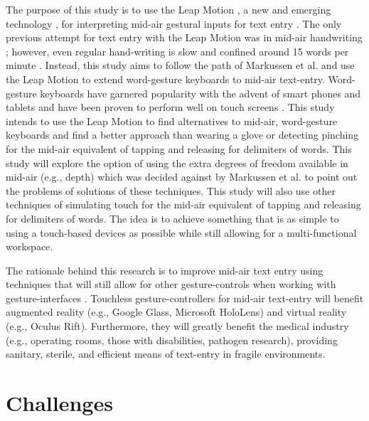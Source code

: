The purpose of this study is to use the Leap Motion \cite{ref_leap_motion}, a new and emerging technology \cite{ref_leap_painting,ref_leap_device_evaluation_1,ref_leap_device_evaluation_2}, for interpreting mid-air gestural inputs for text entry \cite{ref_leap_tech}. The only previous attempt for text entry with the Leap Motion was in mid-air handwriting \cite{ref_air_handwriting}; however, even regular hand-writing is slow and confined around 15 words per minute \cite{ref_handprinting_alternatives}. Instead, this study aims to follow the path of Markussen et al. \cite{ref_vulture} and use the Leap Motion to extend word-gesture keyboards to mid-air text-entry. Word-gesture keyboards have garnered popularity with the advent of smart phones and tablets and have been proven to perform well on touch screens \cite{ref_shape_writing,ref_the_word_gesture_keyboard,ref_shapewriter_iphone}. This study intends to use the Leap Motion to find alternatives to mid-air, word-gesture keyboards and find a better approach than wearing a glove or detecting pinching \cite{ref_vulture,ref_airstroke} for the mid-air equivalent of tapping and releasing for delimiters of words. This study will explore the option of using the extra degrees of freedom available in mid-air (e.g., depth) which was decided against by Markussen et al. \cite{ref_vulture} to point out the problems of solutions of these techniques. This study will also use other techniques of simulating touch for the mid-air equivalent of tapping and releasing for delimiters of words. The idea is to achieve something that is as simple to using a touch-based devices as possible while still allowing for a multi-functional workspace.

The rationale behind this research is to improve mid-air text entry using techniques that will still allow for other gesture-controls when working with gesture-interfaces \cite{ref_large_display_pointing,ref_air_pointing,ref_ray_pointing_large_displays,ref_shadow_reaching,ref_freehand_pointing_large_displays}. Touchless gesture-controllers for mid-air text-entry will benefit augmented reality (e.g., Google Glass, Microsoft HoloLens) and virtual reality (e.g., Oculus Rift). Furthermore, they will greatly benefit the medical industry (e.g., operating rooms, those with disabilities, pathogen research), providing sanitary, sterile, and efficient means of text-entry in fragile environments.

\section{Challenges}

